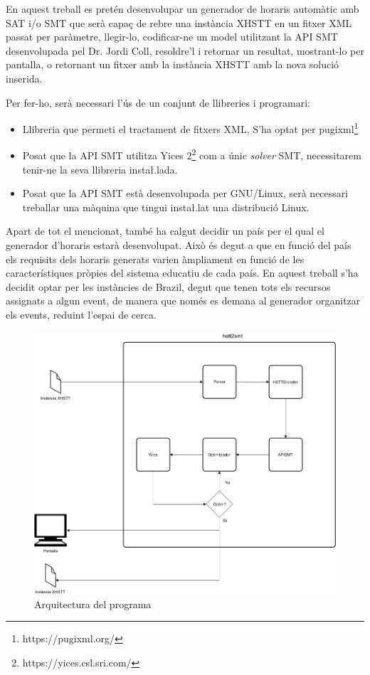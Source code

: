 \documentclass[11pt,a4paper,twoside]{report}
\begin{document}
  En aquest treball es pretén desenvolupar un generador de horaris automàtic 
  amb SAT i/o SMT que serà capaç de rebre una instància XHSTT en un fitxer XML passat per paràmetre, 
  llegir-lo, codificar-ne un model utilitzant la API SMT desenvolupada pel Dr. Jordi Coll, resoldre'l i retornar un resultat, mostrant-lo per pantalla, o retornant un fitxer amb la instància XHSTT amb la nova solució inserida.

  Per fer-ho, serà necessari l'ús de un conjunt de llibreries i programari:

  \begin{itemize}
    \item Llibreria que permeti el tractament de fitxers XML, S'ha optat per pugixml\footnote{https://pugixml.org/}
    \item Posat que la API SMT utilitza Yices 2\footnote{https://yices.csl.sri.com/} com a únic \textit{solver} SMT, necessitarem tenir-ne la seva llibreria insta\l.lada.
    \item Posat que la API SMT està desenvolupada per GNU/Linux, serà necessari treballar una màquina que tingui insta\l.lat una distribució Linux.
  \end{itemize}
  
  Apart de tot el mencionat, també ha calgut decidir un país per el qual el generador d'horaris estarà desenvolupat. Això és degut a que en funció del país els requisits dels horaris generats varien àmpliament en funció de les característiques pròpies del sistema educatiu de cada país.
  En aquest treball s'ha decidit optar per les instàncies de Brazil, degut que tenen tots els recursos assignats a algun event, de manera que només es demana al generador organitzar els events, reduint l'espai de cerca.
 
 \begin{figure}[ht!]
  \includegraphics[width=\textwidth]{Diagrames/Arqui1.png}
  \caption{Arquitectura del programa}
  \label{fig:Arqui1}
\end{figure}
 
\end{document}
